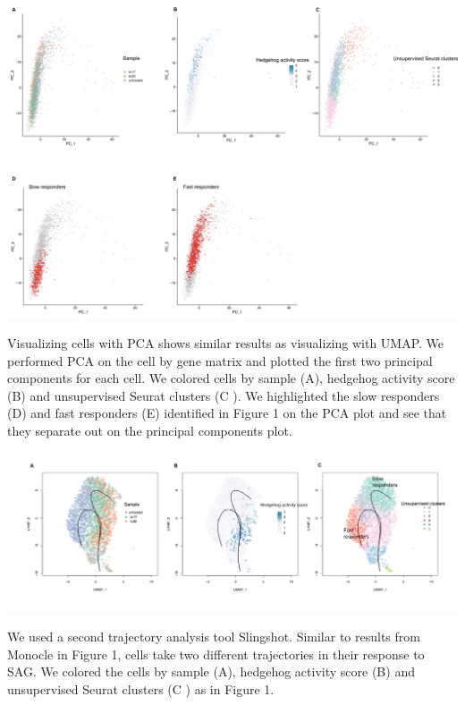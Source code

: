 \begin{suppfigure}[p]  
    \centering
    \includegraphics[width=\linewidth]{figures/hedgehog/SuppFigure5.png}
    \caption[PCA visualizations are similar to UMAP]{
        Visualizing cells with PCA shows similar results as visualizing with UMAP. We performed PCA on the cell by gene matrix and plotted the first two principal components for each cell. We colored cells by sample (A), hedgehog activity score (B) and unsupervised Seurat clusters (C ). We highlighted the slow responders (D) and fast responders (E)  identified in Figure 1 on the PCA plot and see that they separate out on the principal components plot.
    }
    \label{fig:hh_figureS5}
\end{suppfigure}

\begin{suppfigure}[p]  
    \centering
    \includegraphics[width=\linewidth]{figures/hedgehog/SuppFigure6.png}
    \caption[Slingshot trajectory analysis results]{
        We used a second trajectory analysis tool Slingshot. Similar to results from Monocle in Figure 1, cells take two different trajectories in their response to SAG. We colored the cells by sample (A), hedgehog activity score (B) and unsupervised Seurat clusters (C ) as in Figure 1. 
    }
    \label{fig:hh_figureS6}
\end{suppfigure}

